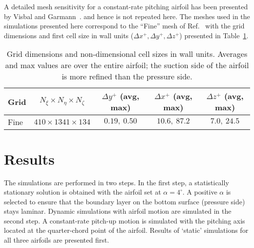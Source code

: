 \documentclass[aps,pra,preprint,groupedaddress]{revtex4-1}
\renewcommand{\=}[1]{\stackrel{#1}{=}} %
\begin{document}
A detailed mesh sensitivity for a constant-rate pitching airfoil has been
presented by Visbal and Garmann~\cite{visbal_2017}. and hence is not repeated
here. The meshes used in the simulations presented here correspond to the
``Fine'' mesh of Ref.~\cite{visbal_2017} with the grid dimensions and first
cell size in wall units ($\Delta x^+, \Delta y^+, \Delta z^+$) presented in
Table~\ref{tab:mesh}.
%
\begin{table}[htb!]
  \centering
  \caption{Grid dimensions and non-dimensional cell sizes in wall units.
  Averages and max values are over the entire airfoil; the suction side of the
  airfoil is more refined than the pressure side.}
  \label{tab:mesh}
  \begin{tabular}{l|c|c|c|c}
    \hline \hline
    Grid & $N_\xi \times N_\eta \times N_\zeta$ & $\Delta y^+$ (avg, max) & $\Delta x^+$ (avg, max) & $\Delta z^+$ (avg, max) \\
    \hline \hline
    Fine   & $410 \times 1341 \times 134$ &  $0.19,~0.50$  &  $10.6,~87.2$  &  $7.0,~24.5$ \\
    \hline \hline
  \end{tabular}
\end{table}

\section{Results}
\label{sec:results}
%
The simulations are performed in two steps. In the first step, a statistically
stationary solution is obtained with the airfoil set at $\alpha= 4^\circ$. A
positive $\alpha$ is selected to ensure that the boundary layer on the bottom
surface (pressure side) stays laminar. Dynamic simulations with airfoil motion
are simulated in the second step. A constant-rate pitch-up motion is simulated
with the pitching axis located at the quarter-chord point of the airfoil.
Results of `static' simulations for all three airfoils are presented first.

\end{document}

